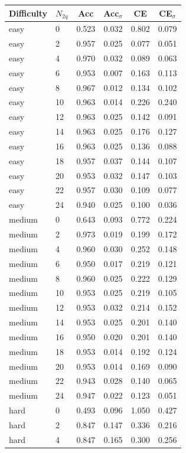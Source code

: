 \begin{tabular}{llcccc}
\toprule
Difficulty & $N_{2q}$ & Acc & Acc$_\sigma$ & CE & CE$_\sigma$ \\
\midrule
easy & 0 & 0.523 & 0.032 & 0.802 & 0.079 \\
easy & 2 & 0.957 & 0.025 & 0.077 & 0.051 \\
easy & 4 & 0.970 & 0.032 & 0.089 & 0.063 \\
easy & 6 & 0.953 & 0.007 & 0.163 & 0.113 \\
easy & 8 & 0.967 & 0.012 & 0.134 & 0.102 \\
easy & 10 & 0.963 & 0.014 & 0.226 & 0.240 \\
easy & 12 & 0.963 & 0.025 & 0.142 & 0.091 \\
easy & 14 & 0.963 & 0.025 & 0.176 & 0.127 \\
easy & 16 & 0.963 & 0.025 & 0.136 & 0.088 \\
easy & 18 & 0.957 & 0.037 & 0.144 & 0.107 \\
easy & 20 & 0.953 & 0.032 & 0.147 & 0.103 \\
easy & 22 & 0.957 & 0.030 & 0.109 & 0.077 \\
easy & 24 & 0.940 & 0.025 & 0.100 & 0.036 \\
medium & 0 & 0.643 & 0.093 & 0.772 & 0.224 \\
medium & 2 & 0.973 & 0.019 & 0.199 & 0.172 \\
medium & 4 & 0.960 & 0.030 & 0.252 & 0.148 \\
medium & 6 & 0.950 & 0.017 & 0.219 & 0.121 \\
medium & 8 & 0.960 & 0.025 & 0.222 & 0.129 \\
medium & 10 & 0.953 & 0.025 & 0.219 & 0.105 \\
medium & 12 & 0.953 & 0.032 & 0.214 & 0.152 \\
medium & 14 & 0.953 & 0.025 & 0.201 & 0.140 \\
medium & 16 & 0.950 & 0.020 & 0.201 & 0.140 \\
medium & 18 & 0.953 & 0.014 & 0.192 & 0.124 \\
medium & 20 & 0.953 & 0.014 & 0.169 & 0.090 \\
medium & 22 & 0.943 & 0.028 & 0.140 & 0.065 \\
medium & 24 & 0.947 & 0.022 & 0.123 & 0.051 \\
hard & 0 & 0.493 & 0.096 & 1.050 & 0.427 \\
hard & 2 & 0.847 & 0.147 & 0.336 & 0.216 \\
hard & 4 & 0.847 & 0.165 & 0.300 & 0.256 \\

\end{tabular}
